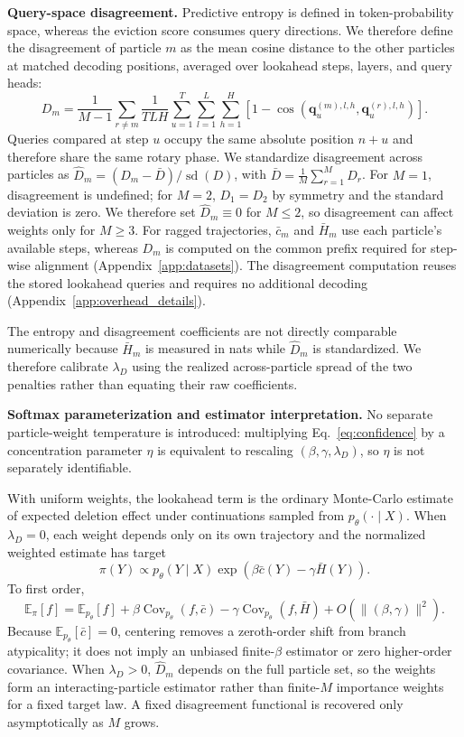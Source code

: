 \documentclass{article} %
\begin{document}
\textbf{Query-space disagreement.}
Predictive entropy is defined in token-probability space, whereas the eviction score consumes query directions. We therefore define the disagreement of particle $m$ as the mean cosine distance to the other particles at matched decoding positions, averaged over lookahead steps, layers, and query heads:
\begin{equation}
D_m=\frac{1}{M-1}\sum_{r\neq m}
\frac{1}{TLH}\sum_{u=1}^{T}\sum_{l=1}^{L}\sum_{h=1}^{H}
\left[1-\cos\!\left(\mathbf q^{(m),l,h}_u,\mathbf q^{(r),l,h}_u\right)\right].
\label{eq:disagreement}
\end{equation}
Queries compared at step $u$ occupy the same absolute position $n+u$ and therefore share the same rotary phase. We standardize disagreement across particles as $\hat D_m=(D_m-\bar D)/\operatorname{sd}(D)$, with $\bar D=\tfrac1M\sum_{r=1}^{M}D_r$. For $M=1$, disagreement is undefined; for $M=2$, $D_1=D_2$ by symmetry and the standard deviation is zero. We therefore set $\hat D_m\equiv0$ for $M\le2$, so disagreement can affect weights only for $M\ge3$. For ragged trajectories, $\bar c_m$ and $\bar H_m$ use each particle's available steps, whereas $D_m$ is computed on the common prefix required for step-wise alignment (Appendix~\ref{app:datasets}). The disagreement computation reuses the stored lookahead queries and requires no additional decoding (Appendix~\ref{app:overhead_details}).

The entropy and disagreement coefficients are not directly comparable numerically because $\bar H_m$ is measured in nats while $\hat D_m$ is standardized. We therefore calibrate $\lambda_D$ using the realized across-particle spread of the two penalties rather than equating their raw coefficients.

\textbf{Softmax parameterization and estimator interpretation.}
No separate particle-weight temperature is introduced: multiplying Eq.~\ref{eq:confidence} by a concentration parameter $\eta$ is equivalent to rescaling $(\beta,\gamma,\lambda_D)$, so $\eta$ is not separately identifiable.

With uniform weights, the lookahead term is the ordinary Monte-Carlo estimate of expected deletion effect under continuations sampled from $p_\theta(\cdot\mid X)$. When $\lambda_D=0$, each weight depends only on its own trajectory and the normalized weighted estimate has target
\[
\pi(Y)\propto p_\theta(Y\mid X)\exp\!\left(\beta\bar c(Y)-\gamma\bar H(Y)\right).
\]
To first order,
\[
\mathbb{E}_{\pi}[f]
=\mathbb{E}_{p_\theta}[f]
+\beta\operatorname{Cov}_{p_\theta}(f,\bar c)
-\gamma\operatorname{Cov}_{p_\theta}(f,\bar H)
+O(\|(\beta,\gamma)\|^2).
\]
Because $\mathbb{E}_{p_\theta}[\bar c]=0$, centering removes a zeroth-order shift from branch atypicality; it does not imply an unbiased finite-$\beta$ estimator or zero higher-order covariance. When $\lambda_D>0$, $\hat D_m$ depends on the full particle set, so the weights form an interacting-particle estimator rather than finite-$M$ importance weights for a fixed target law. A fixed disagreement functional is recovered only asymptotically as $M$ grows.
\end{document}
